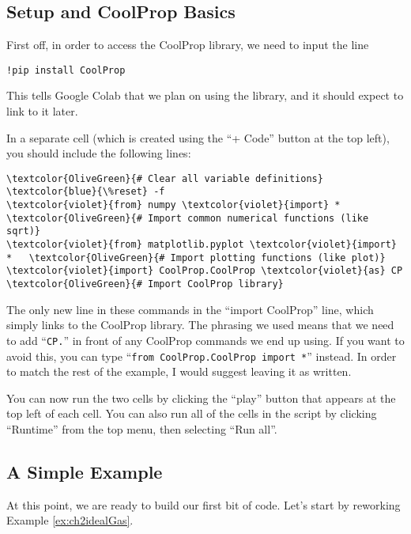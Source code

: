 \subsection{Setup and CoolProp Basics}
First off, in order to access the CoolProp library, we need to input the line

\begin{verbatim}
!pip install CoolProp
\end{verbatim}

This tells Google Colab that we plan on using the library, and it should expect to link to it later.

In a separate cell (which is created using the ``+ Code'' button at the top left), you should include the following lines:

\begin{Verbatim}[commandchars=\\\{\}]
\textcolor{OliveGreen}{# Clear all variable definitions}
\textcolor{blue}{\%reset} -f                         
\textcolor{violet}{from} numpy \textcolor{violet}{import} *               \textcolor{OliveGreen}{# Import common numerical functions (like sqrt)}
\textcolor{violet}{from} matplotlib.pyplot \textcolor{violet}{import} *   \textcolor{OliveGreen}{# Import plotting functions (like plot)}
\textcolor{violet}{import} CoolProp.CoolProp \textcolor{violet}{as} CP    \textcolor{OliveGreen}{# Import CoolProp library}
\end{Verbatim}

The only new line in these commands in the ``import CoolProp'' line, which simply links to the CoolProp library.  The phrasing we used means that we need to add ``\texttt{CP.}'' in front of any CoolProp commands we end up using.  If you want to avoid this, you can type ``\texttt{from CoolProp.CoolProp import *}'' instead.  In order to match the rest of the example, I would suggest leaving it as written.

You can now run the two cells by clicking the ``play'' button that appears at the top left of each cell.  You can also run all of the cells in the script by clicking ``Runtime'' from the top menu, then selecting ``Run all''.

\subsection{A Simple Example}

At this point, we are ready to build our first bit of code.  Let's start by reworking Example \ref{ex:ch2idealGas}.

